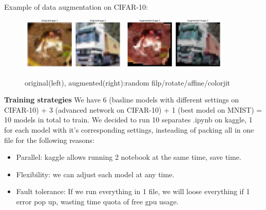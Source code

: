 \documentclass{article}
\begin{document}
\noindent Example of data augmentation on CIFAR-10:

\begin{figure}[htbp]
  \centering
  \includegraphics[width=0.45\textwidth]{fig/original.png} %
  \includegraphics[width=0.45\textwidth]{fig/augmented.png} %
  \caption{original(left), augmented(right):random filp/rotate/affine/colorjit } %
  \label{fig:original} %
\end{figure}

\noindent\textbf{Training strategies}
We have 6 (basline models with different settings on CIFAR-10) + 3 (advanced network on CIFAR-10) + 1 (best model on MNIST) = 10 models in total to train. We decided to run 10 separates .ipynb on kaggle, 1 for each model with it's corresponding settings, insteading of packing all in one file for the following reasons:

\begin{itemize}
  \item Parallel: kaggle allows running 2 notebook at the same time, save time.
  \item Flexibility: we can adjust each model at any time.
  \item Fault tolerance: If we run everything in 1 file, we will loose everything if 1 error pop up, wasting time quota of free gpu usage.
\end{itemize}
\end{document}

